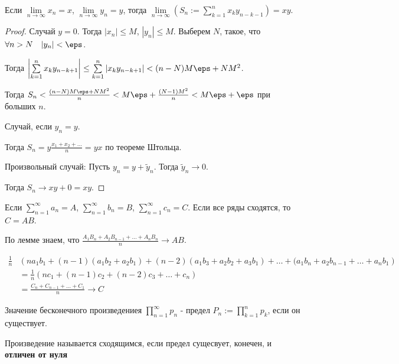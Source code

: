 \begin{lemma} \thmslashn

    Если $\lim\limits_{n \to \infty} x_{n} = x$, $\lim\limits_{n \to \infty} y_{n} = y$, тогда $\lim\limits_{n \to \infty}(S_{n} := \sum\limits_{k=1}^{n} x_{k}y_{n-k-1}) = xy$.
    \begin{proof} \thmslashn
    
        Случай $y=0$. Тогда $|x_{n}| \le M$, $|y_{n}| \le M$. Выберем $N$, такое, что $\forall{n > N}\quad |y_{n}| < \eps$.

        Тогда $\left| \sum\limits_{k=1}^{n} x_{k}y_{n-k+1} \right| \le \sum\limits_{k=1}^{n} |x_{k}y_{n-k+1}| < (n-N)M\eps + NM^2$.

        Тогда $S_{n} < \frac{(n-N)M\eps + NM^2}{n} < M\eps + \frac{(N-1)M^2}{n} < M\eps + \eps$ при больших $n$.

        Случай, если $y_{n}=y$.

        Тогда $S_{n} = y \frac{x_1 + x_2 + \ldots}{n} = yx$ по теореме Штольца.

        Произвольный случай: Пусть $y_{n} = y + \tilde{y}_{n}$. Тогда $\tilde{y}_{n} \to 0$.

        Тогда $S_{n} \to xy + 0 = xy$.
    \end{proof}
\end{lemma}
\begin{theorem} \thmslashn

    Если $\sum\limits_{n=1}^{\infty} a_{n} = A$, $\sum\limits_{n=1}^{\infty} b_{n} = B$, $\sum\limits_{n=1}^{\infty} c_{n} = C$. Если все ряды сходятся, то $C = AB$.

    По лемме знаем, что $\frac{A_1B_{n}+A_2B_{n-1} + \ldots + A_{n}B_{n}}{n} \to AB$.

    \begin{equation*}
        \begin{split}
            \frac{1}{n}&\left( na_1b_1 + (n-1)(a_1b_2 + a_2b_1) + (n-2)(a_1b_3+a_2b_2+a_3b_1) + \ldots + (a_1b_{n}+a_2b_{n-1}+\ldots+a_{n}b_1 \right)\\ 
                       &= \frac{1}{n}(nc_1+(n-1)c_2+(n-2)c_3 + \ldots + c_{n})\\
                       &= \frac{C_{n} + C_{n-1} + \ldots + C_1}{n} \to C
        \end{split}
    \end{equation*}
\end{theorem}
\begin{definition} \thmslashn 

    Значение бесконечного произведениея $\prod\limits_{n=1}^{\infty} p_{n} $ - предел $P_{n} := \prod\limits_{k=1}^{n} p_{k}  $, если он существует.

Произведение называется сходящимся, если предел сущесвует, конечен, и \textbf{отличен от нуля}
\end{definition}
